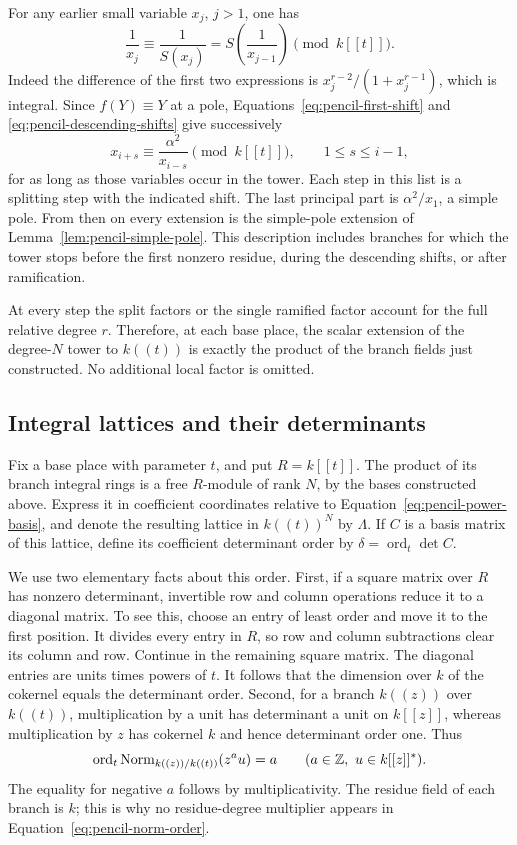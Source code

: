 For any earlier small variable $x_j$, $j>1$, one has
\begin{equation}\label{eq:pencil-descending-shifts}
 \frac1{x_j}\equiv\frac1{S(x_j)}=S\left(\frac1{x_{j-1}}\right)
 \pmod{k[[t]]}.
\end{equation}
Indeed the difference of the first two expressions is
$x_j^{r-2}/(1+x_j^{r-1})$, which is integral.  Since $f(Y)\equiv Y$ at a
pole, Equations~\ref{eq:pencil-first-shift} and
\ref{eq:pencil-descending-shifts} give successively
\[
 x_{i+s}\equiv\frac{\alpha^2}{x_{i-s}}\pmod{k[[t]]},
 \qquad 1\leq s\leq i-1,
\]
for as long as those variables occur in the tower.  Each step in this
list is a splitting step with the indicated shift.  The last principal
part is $\alpha^2/x_1$, a simple pole.  From then on every extension is
the simple-pole extension of Lemma~\ref{lem:pencil-simple-pole}.
This description includes branches for which the tower stops before the
first nonzero residue, during the descending shifts, or after ramification.

At every step the split factors or the single ramified factor account
for the full relative degree $r$.  Therefore, at each base place,
the scalar extension of the degree-$N$ tower to $k((t))$ is exactly the
product of the branch fields just constructed.  No additional local
factor is omitted.

\subsection{Integral lattices and their determinants}

Fix a base place with parameter $t$, and put $R=k[[t]]$.
The product of its branch integral rings is a free $R$-module of rank
$N$, by the bases constructed above.  Express it in coefficient
coordinates relative to Equation~\ref{eq:pencil-power-basis}, and denote
the resulting lattice in $k((t))^N$ by $\Lambda$.  If $C$ is a basis
matrix of this lattice, define its coefficient determinant order by
$\delta=\operatorname{ord}_t\det C$.

We use two elementary facts about this order.  First, if a square matrix
over $R$ has nonzero determinant, invertible row and column operations
reduce it to a diagonal matrix.  To see this, choose an entry of least
order and move it to the first position.  It divides every entry in $R$,
so row and column subtractions clear its column and row.  Continue in
the remaining square matrix.  The diagonal entries are units times
powers of $t$.  It follows that the dimension over $k$ of the cokernel
equals the determinant order.  Second, for a branch $k((z))$ over
$k((t))$, multiplication by a unit has determinant a unit on $k[[z]]$,
whereas multiplication by $z$ has cokernel $k$ and hence determinant
order one.  Thus
\begin{equation}\label{eq:pencil-norm-order}
 \operatorname{ord}_t\operatorname{Norm}_{k((z))/k((t))}(z^a u)=a
 \qquad(a\in\mathbb Z,\ u\in k[[z]]^*).
\end{equation}
The equality for negative $a$ follows by multiplicativity.  The residue
field of each branch is $k$; this is why no residue-degree multiplier
appears in Equation~\ref{eq:pencil-norm-order}.


